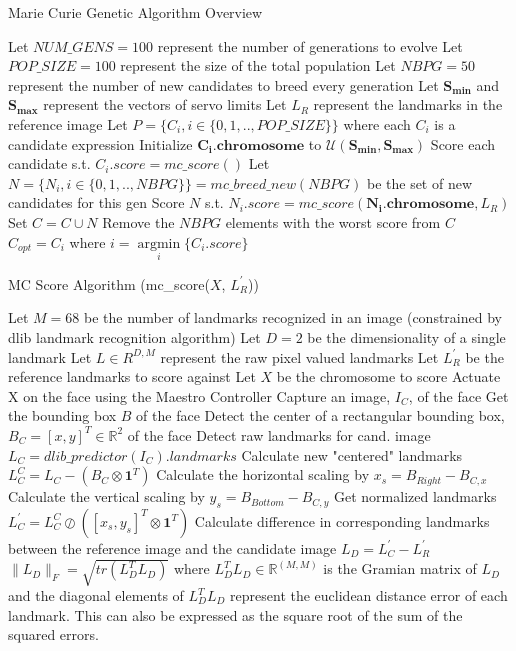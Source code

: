 \documentclass{article}
\DeclareMathOperator*{\argmin}{argmin}
\begin{document}
\begin{algorithm}
	\caption{Marie Curie Genetic Algorithm Overview} 
    \begin{algorithmic}[1]
        \State Let $NUM\_GENS = 100$ represent the number of generations to evolve
        \State Let $POP\_SIZE = 100$ represent the size of the total population
		\State Let $NBPG = 50$ represent the number of new candidates to breed every generation
		\State Let $\bm{S_{min}}$ and $\bm{S_{max}}$ represent the vectors of servo limits
		\State Let $L_R$ represent the landmarks in the reference image
		\State Let $P = \{C_i, i \in \{0, 1, .., POP\_SIZE\}\}$ where each $C_i$ is a candidate expression
			\State Initialize $\mathbf{C_i.chromosome}$ to $\mathcal{U}(\bm{S_{min}}, \bm{S_{max}})$
			\State Score each candidate s.t. $C_i.score = mc\_score()$
		\EndFor
			\State Let $N = \{N_i, i \in \{0, 1, ..,NBPG\}\} = mc\_breed\_new(NBPG)$ be the set of new candidates for this gen
			\State Score $N$ s.t. $N_i.score = mc\_score(\mathbf{N_i.chromosome}, L_R)$
			\State Set $C = C \cup N$
			\State Remove the $NBPG$ elements with the worst score from $C$ 
		\EndFor
		\State \Return $C_{opt} = C_i$ where $i = \argmin\limits_i \{C_i.score\}$
	\end{algorithmic} 
\end{algorithm}

\begin{algorithm}
	\caption{MC Score Algorithm (mc\_score($X$, $L^\prime_R$))} 
	\begin{algorithmic}[1]
		\State Let $M = 68$ be the number of landmarks recognized in an image (constrained by dlib landmark recognition algorithm)
		\State Let $D = 2$ be the dimensionality of a single landmark
		\State Let $L \in R^{D, M}$ represent the raw pixel valued landmarks
		\State Let $L^\prime_R$ be the reference landmarks to score against
		\State Let $X$ be the chromosome to score
		\State Actuate X on the face using the Maestro Controller
		\State Capture an image, $I_C$, of the face
		\State Get the bounding box $B$ of the face
		\State Detect the center of a rectangular bounding box, $B_C = [x, y]^T \in \mathbb{R}^2$ of the face
		\State Detect raw landmarks for cand. image $L_C = dlib\_predictor(I_C).landmarks$
		\State Calculate new "centered" landmarks $L^C_C = L_C - (B_C \otimes \mathbf{1}^T)$
		\State Calculate the horizontal scaling by $x_s = B_{Right} - B_{C, x}$
		\State Calculate the vertical scaling by $y_s = B_{Bottom} - B_{C, y}$
		\State Get normalized landmarks $L^\prime_C = L^C_C \oslash ([x_s, y_s]^T \otimes \mathbf{1}^T)$
		\State Calculate difference in corresponding landmarks between the reference image and the candidate image $L_D = L^\prime_C - L^\prime_R$
		\State \Return $\| L_D \|_F = \sqrt{tr(L^T_DL_D)}$ where $L^T_DL_D \in \mathbb{R}^{(M, M)}$ is the Gramian matrix of $L_D$ and the diagonal elements of $L^T_DL_D$ represent the euclidean distance error of each landmark.  This can also be expressed as the square root of the sum of the squared errors.
	\end{algorithmic}
\end{algorithm}
\end{document}

